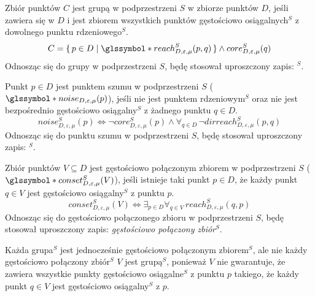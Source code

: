  \newline
Zbiór punktów $ C $ jest grupą w podprzestrzeni $ S $ w zbiorze punktów $ D $, jeśli zawiera się w $ D $ i jest zbiorem wszystkich punktów gęstościowo osiągalnych$^S$ z dowolnego punktu rdzeniowego$^S$. 
\begin{equation}
C = \set{p \in D | \s{reach}^S_{D,\varepsilon,\mu}(p, q)} \land core^S_{D,\varepsilon,\mu}(q)
\end{equation}
Odnosząc się do grupy w podprzestrzeni $ S $, będę stosował uproszczony zapis: \textit{$^S$}.
\smallskip

 \newline
Punkt $ p\in D $ jest punktem szumu w podprzestrzeni $ S $ ($ \s{noise}_{D,\varepsilon,\mu}(p) $), jeśli nie jest punktem rdzeniowym$^S$ oraz nie jest bezpośrednio gęstościowo osiągalny$^S$ z żadnego punktu $q \in D$. 
\begin{equation}
noise^S_{D,\varepsilon,\mu}(p) \iff \neg core^S_{D,\varepsilon,\mu}(p) \land \forall_{q\in D}\,\neg dirreach^S_{D,\varepsilon,\mu}(p, q)
\end{equation}
Odnosząc się do punktu szumu w podprzestrzeni $ S $, będę stosował uproszczony zapis: \textit{$^S$}.
\smallskip

\newline
Zbiór punktów $ V \subseteq D $ jest gęstościowo połączonym zbiorem w podprzestrzeni $ S $ ($ \s{conset}^S_{D,\varepsilon, \mu}(V) $), jeśli istnieje taki punkt $ p \in D $, że każdy punkt $ q \in V $ jest gęstościowo osiągalny$^S$ z punktu $ p $.
\begin{equation}
	conset^S_{D,\varepsilon, \mu}(V) \iff 
	\exists_{p\in D}
	\forall_{q\in V}
	\,reach^S_{D,\varepsilon,\mu}(q, p)
\end{equation}
Odnosząc się do gęstościowo połączonego zbioru w podprzestrzeni $ S $, będę stosował uproszczony zapis: \textit{gęstościowo połączony zbiór$^S$}. 

Każda grupa$ ^S $ jest jednocześnie gęstościowo połączonym zbiorem$^S $, ale nie każdy gęstościowo połączony zbiór$^S $ $ V $ jest grupą$^S $, ponieważ $ V $ nie gwarantuje, że zawiera wszystkie punkty gęstościowo osiągalne$ ^S $ z punktu $ p $ takiego, że każdy punkt $ q\in V $ jest gęstościowo osiągalny$ ^S $ z $ p $.
\smallskip

